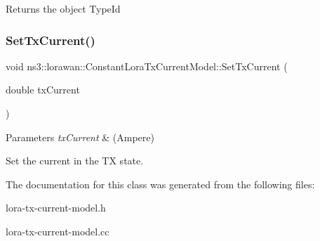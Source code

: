 \begin{DoxyReturn}{Returns}
the object Type\+Id 
\end{DoxyReturn}
\mbox{\label{classns3_1_1lorawan_1_1ConstantLoraTxCurrentModel_a3c1a59240065eb000df03cbd34b020da}} 
\subsubsection{\texorpdfstring{Set\+Tx\+Current()}{SetTxCurrent()}}
{\footnotesize\ttfamily void ns3\+::lorawan\+::\+Constant\+Lora\+Tx\+Current\+Model\+::\+Set\+Tx\+Current (\begin{DoxyParamCaption}\item[{double}]{tx\+Current }\end{DoxyParamCaption})}


\begin{DoxyParams}{Parameters}
{\em tx\+Current} & (Ampere)\\
\hline
\end{DoxyParams}
Set the current in the TX state. 

The documentation for this class was generated from the following files\+:\begin{DoxyCompactItemize}
\item 
lora-\/tx-\/current-\/model.\+h\item 
lora-\/tx-\/current-\/model.\+cc\end{DoxyCompactItemize}
